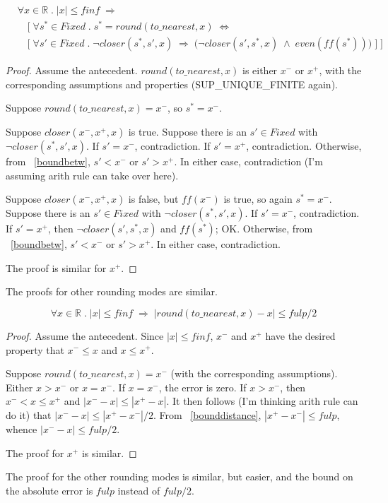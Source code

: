 \documentclass{article}
\begin{document}
\begin{thm}
\label{rndnear}
\begin{align*}
&\forall x \in \mathbb{R} \; . \; |x| \leq finf \;
\Longrightarrow \\
& \quad \Big [ \; \forall s^* \in Fixed \; . \; s^* = round(to\_nearest,x) \; 
\Longleftrightarrow \\
& \quad \Big [ \; \forall s' \in Fixed \; . \; 
\neg closer(s^*, s', x) \; 
\Longrightarrow
\; \big(\neg closer(s', s^*, x) \; \wedge \; even(ff(s^*)) \big) \; \Big ]
\; \Big ]
\end{align*}
\begin{proof} Assume the antecedent. $round(to\_nearest,x)$ is either
$x^-$ or $x^+$, with the corresponding assumptions and properties
(SUP\_UNIQUE\_FINITE again).

Suppose $round(to\_nearest, x) = x^-$, so $s^* = x^-$. 

Suppose $closer(x^-, x^+,x)$ is true. Suppose there is an $s' \in Fixed$
with $\neg closer(s^*, s', x)$. If $s' = x^-$, contradiction. If
$s' = x^+$, contradiction. Otherwise, from ~\ref{boundbetw}, $s' < x^-$
or $s' > x^+$. In either case, contradiction (I'm assuming arith rule
can take over here).

Suppose $closer(x^-, x^+,x)$ is false, but $ff(x^-)$ is true, so
again $s^* = x^-$. Suppose there is an $s' \in Fixed$
with $\neg closer(s^*, s', x)$. If $s' = x^-$, contradiction. If
$s' = x^+$, then $\neg closer(s', s^*, x)$ and $ff(s^*)$; OK. Otherwise, 
from ~\ref{boundbetw}, $s' < x^-$ or $s' > x^+$. In either case, contradiction.

The proof is similar for $x^+$.
\end{proof}
\end{thm}

The proofs for other rounding modes are similar.

\begin{thm}
\label{abserror}
\begin{equation*}
\forall x \in \mathbb{R} \; . \; |x| \leq finf \; \Longrightarrow \;
|round(to\_nearest, x) - x| \leq fulp/2
\end{equation*}
\begin{proof} Assume the antecedent. Since $|x| \leq finf$, 
$x^-$ and $x^+$ have the desired property that $x^- \leq x$ and
$x \leq x^+$.

Suppose $round(to\_nearest,x) = x^-$ (with the corresponding assumptions).
Either $x > x^-$ or $x = x^-$. If $x = x^-$, the error is zero. If $x > x^-$,
then $x^- < x \leq x^+$ and $|x^- - x| \leq |x^+ - x|$. It then follows
(I'm thinking arith rule can do it) that $|x^-  - x| \leq |x^+ - x^-| / 2$.
From ~\ref{bounddistance}, $|x^+ - x^-| \leq fulp$, whence $|x^- - x| \leq 
fulp/2$.

The proof for $x^+$ is similar.
\end{proof}
\end{thm}

The proof for the other rounding modes is similar, but easier, and the
bound on the absolute error is $fulp$ instead of $fulp/2$.
\end{document}
